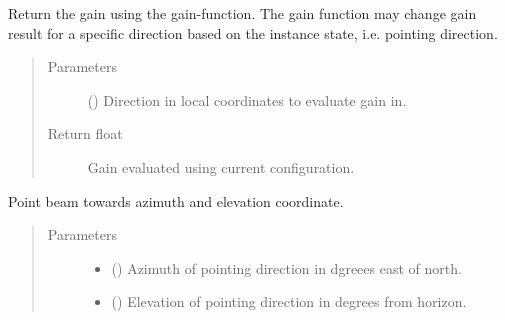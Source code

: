 \documentclass[letterpaper,10pt,english]{sphinxmanual}
\begin{document}
\begin{fulllineitems}
\begin{fulllineitems}
\label{\detokenize{modules/antenna:antenna.BeamPattern.gain}}
Return the gain using the gain-function. The gain function may change gain result for a specific direction based on the instance state, i.e. pointing direction.
\begin{quote}\begin{description}
\item[{Parameters}] \leavevmode
{} () \textendash{} Direction in local coordinates to evaluate gain in.

\item[{Return float}] \leavevmode
Gain evaluated using current configuration.

\end{description}\end{quote}

\end{fulllineitems}


\begin{fulllineitems}
\label{\detokenize{modules/antenna:antenna.BeamPattern.point}}
Point beam towards azimuth and elevation coordinate.
\begin{quote}\begin{description}
\item[{Parameters}] \leavevmode\begin{itemize}
\item {} 
 () \textendash{} Azimuth of pointing direction in dgreees east of north.

\item {} 
 () \textendash{} Elevation of pointing direction in degrees from horizon.

\end{itemize}

\end{description}\end{quote}

\end{fulllineitems}


\end{fulllineitems}
\end{document}
